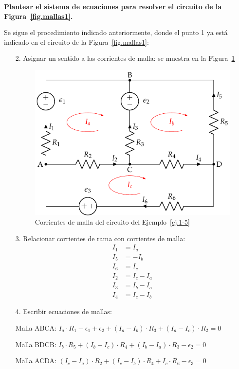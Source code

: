 	\begin{example}
		\label{ej.1-5}
		\textbf{Plantear el sistema de ecuaciones para resolver el circuito de la Figura~\ref{fig.mallas1}.}
		
		Se sigue el procedimiento indicado anteriormente, donde el punto 1 ya está indicado en el circuito de la Figura~\ref{fig.mallas1}: 
		\begin{enumerate}
			\item[2.] Asignar un sentido a las corrientes de malla: se muestra en la Figura~\ref{fig.mallas1_corrientes}
			\begin{figure}[H]
				\centering
				\includegraphics[width=0.5\linewidth]{../figs/mallas1_corrientes.pdf}
				\caption{Corrientes de malla del circuito del Ejemplo~\ref{ej.1-5}}
				\label{fig.mallas1_corrientes}
			\end{figure}
			\item[3.] Relacionar corrientes de rama con corrientes de malla:
			\begin{align*}
				I_1 &= I_a\\
				I_5 &= -I_b\\
				I_6 &= I_c\\
				I_2 &= I_c -I_a\\
				I_3 &= I_b - I_a\\
				I_4 &= I_c - I_b
			\end{align*}
			\item[4.] Escribir ecuaciones de mallas: 
			
			Malla ABCA: $I_a \cdot R_1 - \epsilon_1 + \epsilon_2 + (I_a - I_b) \cdot R_3 + (I_a - I_c) \cdot R_2 = 0$
			
			Malla BDCB: $I_b \cdot R_5 + (I_b - I_c) \cdot R_4 + (I_b - I_a) \cdot R_3 - \epsilon_2 = 0$
			
			Malla ACDA: $(I_c - I_a) \cdot R_2 + (I_c - I_b) \cdot R_4 + I_c \cdot R_6 - \epsilon_3 = 0$
			

\end{enumerate}
\end{example}
